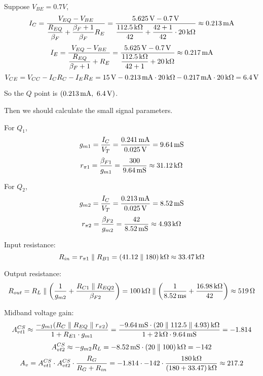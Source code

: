 \documentclass{article}
\newcommand{\unit}[1]{{\rm\,#1}}
\begin{document}
\begin{enumerate}[(1)]
Suppose $V_{BE}=0.7V$,
$$I_C=\frac{V_{EQ}-V_{BE}}{\dfrac{R_{EQ}}{\beta_F}+\dfrac{\beta_F+1}{\beta_F}R_E}=\frac{5.625\unit{V}-0.7\unit{V}}{\dfrac{112.5\unit{k\Omega}}{42}+\dfrac{42+1}{42}\cdot20\unit{k\Omega}}\approx0.213\unit{mA}$$
$$I_E=\frac{V_{EQ}-V_{BE}}{\dfrac{R_{EQ}}{\beta_F+1}+R_E}=\frac{5.625\unit{V}-0.7\unit{V}}{\dfrac{112.5\unit{k\Omega}}{42+1}+20\unit{k\Omega}}\approx0.217\unit{mA}$$
$$V_{CE}=V_{CC}-I_CR_C-I_ER_E=15\unit{V}-0.213\unit{mA}\cdot20\unit{k\Omega}-0.217\unit{mA}\cdot20\unit{k\Omega}=6.4\unit{V}$$

So the $Q$ point is $(0.213\unit{mA},\ 6.4\unit{V})$.

\end{enumerate}

Then we should calculate the small signal parameters.

For $Q_1$, $$g_{m1}=\frac{I_C}{V_T}=\frac{0.241\unit{mA}}{0.025\unit{V}}=9.64\unit{mS}$$
$$r_{\pi1}=\frac{\beta_{F1}}{g_{m1}}=\frac{300}{9.64\unit{mS}}\approx31.12\unit{k\Omega}$$

For $Q_2$, $$g_{m2}=\frac{I_C}{V_T}=\frac{0.213\unit{mA}}{0.025\unit{V}}=8.52\unit{mS}$$
$$r_{\pi2}=\frac{\beta_{F2}}{g_{m2}}=\frac{42}{8.52\unit{mS}}\approx4.93\unit{k\Omega}$$

Input resistance:
$$R_{in}=r_{\pi1}\parallel R_{B1}=(41.12\parallel180)\unit{k\Omega}\approx33.47\unit{k\Omega}$$

Output resistance:
$$R_{out}=R_L\parallel\left(\frac{1}{g_{m2}}+\frac{R_{C1}\parallel R_{EQ2}}{\beta_{F2}}\right)=100\unit{k\Omega}\parallel\left(\frac{1}{8.52\unit{ms}}+\frac{16.98\unit{k\Omega}}{42}\right)\approx519\unit{\Omega}$$

Midband voltage gain:
$$A_{vt1}^{CS}\approx\frac{-g_{m1}(R_C\parallel R_{EQ}\parallel r_{\pi2})}{1+R_{E1}\cdot g_{m1}}=\frac{-9.64\unit{mS}\cdot(20\parallel112.5\parallel4.93)\unit{k\Omega}}{1+2\unit{k\Omega}\cdot9.64\unit{mS}}=-1.814$$
$$A_{vt2}^{CS}\approx-g_{m2}R_L=-8.52\unit{mS}\cdot(20\parallel100)\unit{k\Omega}=-142$$
$$A_v=A_{vt1}^{CS}\cdot A_{vt2}^{CS}\cdot\frac{R_G}{R_G+R_{in}}=-1.814\cdot-142\cdot\frac{180\unit{k\Omega}}{(180+33.47)\unit{k\Omega}}\approx217.2$$
\end{document}
